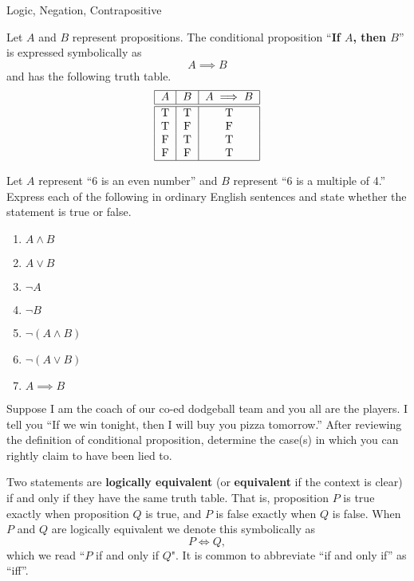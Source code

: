 \begin{section}{Logic, Negation, Contrapositive}
\begin{definition}\label{def:conditional}
Let $A$ and $B$ represent propositions.  The conditional proposition ``\textbf{If $A$, then $B$}'' is expressed symbolically as 
\[
A \implies B
\]
and has the following truth table.
\[
\begin{tabular}{| c | c  | c |} \hline
$A$  &  $B$ & $A \implies B$  \\ \hline\hline
T & T & T  \\ 
T & F & F  \\ 
F & T & T  \\ 
F & F & T  \\ \hline
\end{tabular}
\]
\end{definition}

\begin{exercise}\label{exer:translations}
Let $A$ represent ``6 is an even number'' and $B$ represent ``6 is a multiple of 4.''  Express each of the following in ordinary English sentences and state whether the statement is true or false.
\begin{enumerate}
  \item $A \wedge B$
  \item $A \vee B$
  \item $\neg A$
  \item $\neg B$
  \item $\neg (A \wedge B)$
  \item $\neg (A \vee B)$
  \item $A \implies B$
\end{enumerate}
\end{exercise}

\begin{problem}
Suppose I am the coach of our co-ed dodgeball team and you all are the players.  I tell you ``If we win tonight, then I will buy you pizza tomorrow.''  After reviewing the definition of conditional proposition, determine the case(s) in which you can rightly claim to have been lied to.
\end{problem}

\begin{definition}
Two statements are \textbf{logically equivalent} (or \textbf{equivalent} if the context is clear) if and only if they have the same truth table.  That is, proposition $P$ is true exactly when proposition $Q$ is true, and $P$ is false exactly when $Q$ is false.  When $P$ and $Q$ are logically equivalent we denote this symbolically as 
\[
P \iff Q,
\]
which we read ``$P$ if and only if $Q$".  It is common to abbreviate ``if and only if'' as ``iff''.
\end{definition}


\end{section}
